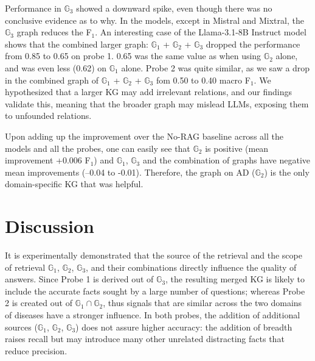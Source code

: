 Performance in $\mathbb{G}_3$ showed a downward spike, even though there was no conclusive evidence as to why. In the models, except in Mistral and Mixtral, the $\mathbb{G}_3$ graph reduces the F$_1$. An interesting case of the Llama-3.1-8B  Instruct model shows that the combined larger graph: $\mathbb{G}_1$ + $\mathbb{G}_2$ + $\mathbb{G}_3$ dropped the performance from 0.85 to 0.65 on probe 1. 0.65 was the same value as when using $\mathbb{G}_2$ alone, and was even less (0.62) on $\mathbb{G}_1$ alone.  Probe 2 was quite similar, as we saw a drop in the combined graph of  $\mathbb{G}_1$ + $\mathbb{G}_2$ + $\mathbb{G}_3$ fom 0.50 to 0.40 macro F$_1$. We hypothesized that a larger KG may add irrelevant relations, and our findings validate this, meaning that the broader graph may mislead LLMs, exposing them to unfounded relations. 

Upon adding up the improvement over the No-RAG baseline across all the models and all the probes, one can easily see that $\mathbb{G}_2$ is positive (mean improvement +0.006 F$_1$) and $\mathbb{G}_1$, $\mathbb{G}_3$ and the combination of graphs have negative mean improvements (–0.04 to -0.01). Therefore, the graph on AD ($\mathbb{G}_2$) is the only domain-specific KG that was helpful.


\section{Discussion}
\label{sec:discussion}
It is experimentally demonstrated that the source of the retrieval and the scope of retrieval $\mathbb{G}_1$, $\mathbb{G}_2$, $\mathbb{G}_3$, and their combinations directly influence the quality of answers. Since Probe 1 is derived out of $\mathbb{G}_3$, the resulting merged KG is likely to include the accurate facts sought by a large number of questions; whereas Probe 2 is created out of $\mathbb{G}_1 \cap \mathbb{G}_2$, thus signals that are similar across the two domains of diseases have a stronger influence. In both probes, the addition of additional sources ($\mathbb{G}_1$, $\mathbb{G}_2$, $\mathbb{G}_3$) does not assure higher accuracy: the addition of breadth raises recall but may introduce many other unrelated distracting facts that reduce precision.

\newcommand{\sym}[1]{\ifmmode^{#1}\else\(^{#1}\)\fi}

